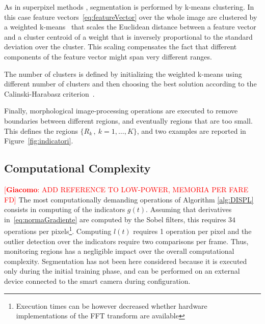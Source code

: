 \documentclass{llncs}
\newcommand{\gi}[1]{{\textcolor{red}{[\small \textbf{Giacomo}: #1]}}}
\begin{document}
As in superpixel methods \cite{Susstrunk2012}, segmentation is performed by k-means clustering. In this case feature vectors~\eqref{eq:featureVector} over the whole image are clustered by a weighted k-means~\cite{kottke1994motion} that scales the Euclidean distance between a feature vector and a cluster centroid of a weight that is inversely proportional to the standard deviation over the cluster. This scaling compensates the fact that different components of the feature vector might span very different ranges.

The number of clusters is defined by initializing the weighted k-means using different number of clusters and then choosing the best solution according to the Calinski-Harabasz criterion~\cite{calinski1974dendrite}.

Finally, morphological image-processing operations are executed to remove boundaries between different regions, and eventually regions that are too small. This defines the regions $\{R_k\,, \ k=1,\dots,K\}$, and two examples are reported in Figure~\ref{fig:indicatori}.

\subsection{Computational Complexity}\label{subsec:coputationalComplexity}

\gi{ADD REFERENCE TO LOW-POWER, MEMORIA PER FARE FD}
The most computationally demanding operations of Algorithm \ref{alg:DISPL} consists in computing of the indicators $g(t)$. Assuming that derivatives in~\eqref{eq:normaGradiente} are computed by the Sobel filters, this requires $34$ operations per pixels\footnote{Execution times can be however  decreased whether hardware implementations of the FFT transform are available}. Computing $l(t)$ requires 1 operation per pixel and the outlier detection over the indicators require two comparisons per frame. Thus, monitoring regions has a negligible impact over the overall computational complexity. 
Segmentation has not been here considered because it is executed only during the initial training phase, and can be performed on an external device connected to the smart camera during configuration.


\vspace{-0.2cm}
\end{document}
